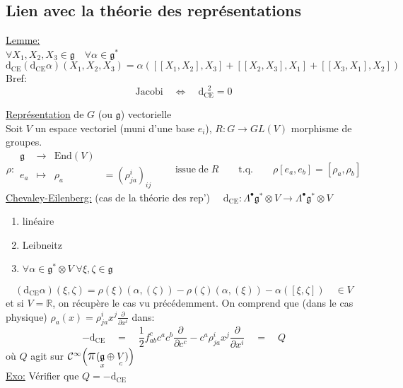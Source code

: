 \documentclass[a4paper,11pt]{article}
\renewcommand{\d}{{\mathrm{d}}}
\newcommand{\dr}[2]{\frac{\partial {#1}}{\partial{#2}}}
\newcommand{\ppi}{{\mathlarger{\mathlarger{\mathlarger{\pi}}}}}
\begin{document}
\subsection{Lien avec la théorie des représentations}
\underline{Lemme:}\\
$\forall X_1,X_2,X_3 \in \mathfrak{g}\quad \forall \alpha\in \mathfrak{g}^*$
$$\d_\mathrm{CE}(\d_\mathrm{CE}\alpha)(X_1,X_2,X_3) = \alpha([[X_1,X_2],X_3]+[[X_2,X_3],X_1]+[[X_3,X_1],X_2])$$
Bref:
$$\boxed{\boxed{\mathrm{Jacobi}\quad \iff \quad \d_\mathrm{CE}^{\;\;2}=0}}$$

\noindent\underline{Représentation} de $G$ (ou $\mathfrak{g}$) vectorielle\\
Soit $V$ un espace vectoriel (muni d'une base $e_i$), $R:G\to GL(V)$ morphisme de groupes.
$$\rho : \begin{matrix}
\mathfrak{g} & \to & \mathrm{End}(V)&\\
e_a & \mapsto & \rho_a & = (\rho^i_{ja})_{ij}
\end{matrix}\quad\quad \mathrm{issue}\;\mathrm{de}\;R\quad \quad \mathrm{t}.\mathrm{q}.\quad \quad \rho[e_a,e_b]=[\rho_a,\rho_b]$$
\underline{Chevaley-Eilenberg:} (cas de la théorie des rep') $\quad \d_\mathrm{CE}: \Lambda^\bullet\mathfrak g^*\otimes V \longrightarrow\Lambda^\bullet\mathfrak g^*\otimes V$
\begin{enumerate}
\item linéaire
\item Leibneitz
\item $\forall\alpha\in\mathfrak{g}^*\otimes V\;\forall\xi,\zeta\in\mathfrak{g}$
\end{enumerate}
$$\boxed{(\d_\mathrm{CE}\alpha)(\xi,\zeta) = \rho(\xi)(\alpha,(\zeta))-\rho(\zeta)(\alpha,(\xi)) - \alpha([\xi,\zeta])}\quad \in V$$
et si $V=\mathbb{R}$, on récupère le cas vu précédemment. On comprend que (dans le cas physique) $\rho_a(x) = \rho^i_{ja}x^j\dr{}{x^i}$ dans:
$$-\d_\mathrm{CE} \quad=\quad \frac12 f^c_{ab}c^ac^b\dr{}{c^c} - c^a\rho^i_{ja}x^j\dr{}{x^i} \quad=\quad Q$$
où $Q$ agit sur $\mathcal{C}^\infty\Big(\ppi(\underset x{\mathfrak{g}}\oplus \underset c V)\Big)$\\
\underline{Exo:} Vérifier que $Q=-\d_\mathrm{CE}$\\
\end{document}
